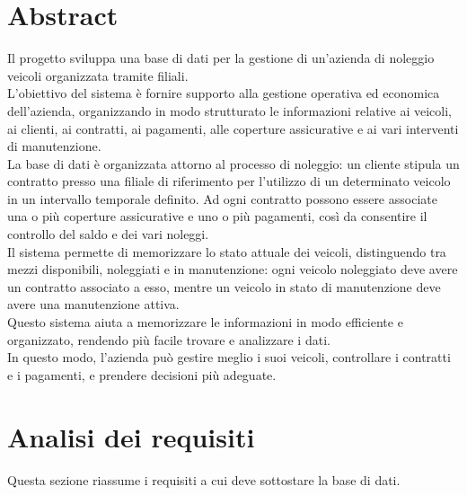 \documentclass[10pt,a4paper]{article}
\begin{document}
\section{Abstract}
Il progetto sviluppa una base di dati per la gestione di un'azienda di noleggio veicoli organizzata tramite filiali.\\
L'obiettivo del sistema è fornire supporto alla gestione operativa ed economica dell'azienda, organizzando in modo strutturato le informazioni relative ai veicoli, ai clienti, ai contratti, ai pagamenti, alle coperture assicurative e ai vari interventi di manutenzione.\\
La base di dati è organizzata attorno al processo di noleggio: un cliente stipula un contratto presso una filiale di riferimento per l'utilizzo di un determinato veicolo in un intervallo temporale definito. Ad ogni contratto possono essere associate una o più coperture assicurative e uno o più pagamenti, così da consentire il controllo del saldo e dei vari noleggi.\\
Il sistema permette di memorizzare lo stato attuale dei veicoli, distinguendo tra mezzi disponibili, noleggiati e in manutenzione: ogni veicolo noleggiato deve avere un contratto associato a esso, mentre un veicolo in stato di manutenzione deve
avere una manutenzione attiva.\\
Questo sistema aiuta a memorizzare le informazioni in modo efficiente e organizzato, rendendo più facile trovare e analizzare i dati.\\
In questo modo, l'azienda può gestire meglio i suoi veicoli, controllare i contratti e i pagamenti, e prendere decisioni più adeguate.

\section{Analisi dei requisiti} \label{analisirequisiti}
Questa sezione riassume i requisiti a cui deve sottostare la base di dati.
\end{document}
